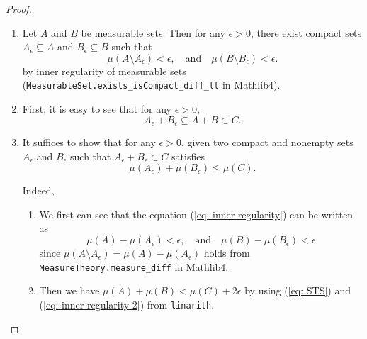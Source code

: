 \begin{proof}
\begin{enumerate}
        \begin{enumerate}
            \item Let \(A\) and \(B\) be measurable sets. Then for any \(\epsilon>0\), there exist compact sets \(A_\epsilon \subseteq A\) and \(B_\epsilon \subseteq B\) such that 
            \begin{equation}
                \mu(A \setminus A_\epsilon)< \epsilon, \quad \text{and} \quad \mu(B \setminus B_\epsilon) < \epsilon.
                \label{eq: inner regularity}
            \end{equation}
            by inner regularity of measurable sets (\texttt{MeasurableSet.exists\_isCompact\_diff\_lt} in Mathlib4).

            \item First, it is easy to see that for any \(\epsilon>0\), 
            \begin{equation*}
                A_\epsilon + B_\epsilon \subseteq A + B \subset C.
            \end{equation*}

            \item It suffices to show that for any \(\epsilon>0\), given two compact and {\color{red}nonempty} sets \(A_\epsilon\) and \(B_\epsilon\) such that 
            {\color{red}
            \(A_\epsilon + B_\epsilon \subset C\) satisfies
            \begin{equation}
                \mu(A_\epsilon) + \mu(B_\epsilon) \leq \mu(C).
                \label{eq: STS}
            \end{equation}
            }
            
            Indeed, 
            \begin{enumerate}[(c1)]
                \item We first can see that the equation (\ref{eq: inner regularity}) can be written as
                \begin{equation}
                    \mu(A)-\mu(A_\epsilon) < \epsilon, \quad \text{and} \quad \mu(B) - \mu(B_\epsilon) < \epsilon
                    \label{eq: inner regularity 2}
                \end{equation}
                since \(\mu(A\setminus A_\epsilon) = \mu(A)-\mu(A_\epsilon)\) holds from \texttt{MeasureTheory.measure\_diff} in Mathlib4.

                \item Then we have \(\mu(A) + \mu(B) < \mu(C) + 2\epsilon\) by using (\ref{eq: STS}) and (\ref{eq: inner regularity 2}) from \texttt{linarith}.


\end{enumerate}
\end{enumerate}
\end{enumerate}
\end{proof}

